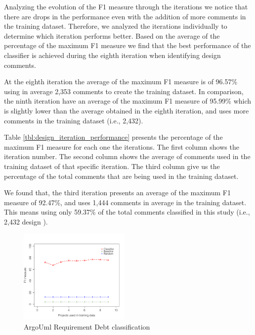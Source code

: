 Analyzing the evolution of the F1 measure through the iterations we notice that there are drops in the performance even with the addition of more comments in the training dataset. Therefore, we analyzed the iterations individually to determine which iteration performs better. Based on the average of the percentage of the maximum F1 measure we find that the best performance of the classifier is achieved during the eighth iteration when identifying design \SATD comments. 

At the eighth iteration the average of the maximum F1 measure is of 96.57\% using in average 2,353 comments to create the training dataset. In comparison, the ninth iteration have an average of the maximum F1 measure of 95.99\% which is slightly lower than the average obtained in the eighth iteration, and uses more comments in the training dataset (i.e., 2,432). 

Table \ref{tbl:design_iteration_performance} presents the percentage of the maximum F1 measure for each one the iterations. The first column shows the iteration number. The second column shows the average of comments used in the training dataset of that specific iteration. The third column give us the percentage of the total comments that are being used in the training dataset. 

We found that, the third iteration presents an average of the maximum F1 measure of 92.47\%, and uses 1,444 comments in average in the training dataset. This means using only 59.37\% of the total comments classified in this study (i.e., 2,432 design \SATD). 

\begin{figure}[thb!]
  \centering
  \includegraphics[width = 0.48\textwidth]{figures/implementation_argo.pdf}
  \vspace{-3mm}
  \caption{ArgoUml Requirement Debt classification}
  \label{fig:implementation_argo_result}
\end{figure}

